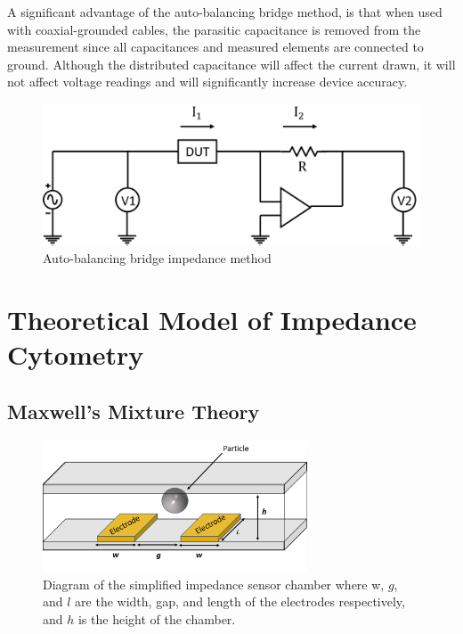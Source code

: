 A significant advantage of the auto-balancing bridge method, is that when used with coaxial-grounded cables, the parasitic capacitance is removed from the measurement since all capacitances and measured elements are connected to ground. Although the distributed capacitance will affect the current drawn, it will not affect voltage readings and will significantly increase device accuracy.

 \begin{figure}[ht]
    \centering
    \includegraphics[width=\textwidth]{images/autoBalancingBridge.png}
    \caption[Auto-balancing bridge impedance method]{Auto-balancing bridge impedance method}
    \label{fig:auto-balancing_bridge}
\end{figure}
 
 
 \section[Model of Cell Suspension Impedance]{Theoretical Model of Impedance Cytometry}
 \label{sec:theory_impedance_cytometry}

\subsection{Maxwell's Mixture Theory}
\label{sec:maxwell_mixture_theory}
 \begin{figure}[ht]
 \centering
 \includegraphics[width=0.7\textwidth]{images/cellAndElectrodes.png}
 \caption[Schematic diagram of simplified impedance sensor chamber.]{Diagram of the simplified impedance sensor chamber where w, $g$, and $l$ are the width, gap, and length of the electrodes respectively, and $h$ is the height of the chamber.}
 \label{fig:simplified_IS}
 \end{figure}
 
